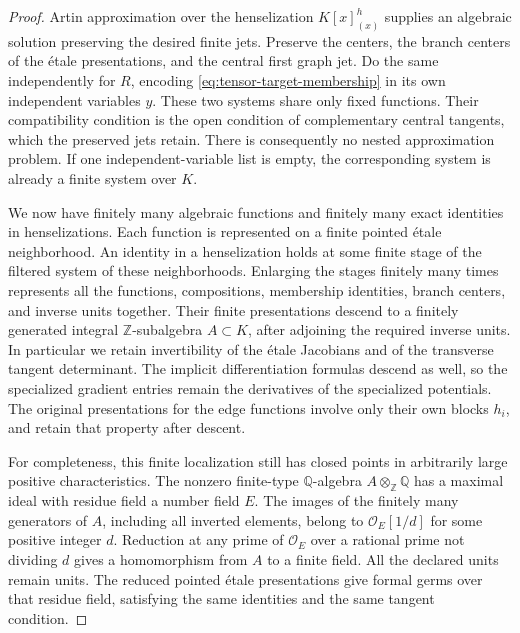 \begin{proof}
Artin approximation over the henselization \(K[x]_{(x)}^h\)
\cite[Theorem~1.10]{Artin1969} supplies an algebraic solution preserving
the desired finite jets.  Preserve the centers, the branch centers of
the étale presentations, and the central first graph jet.
Do the same independently for \(R\), encoding
\eqref{eq:tensor-target-membership} in its own independent variables \(y\).
These two systems share only fixed functions.  Their compatibility
condition is the open condition of complementary central tangents, which
the preserved jets retain.  There is consequently no nested approximation
problem.  If one independent-variable list is empty, the corresponding
system is already a finite system over \(K\).

We now have finitely many algebraic functions and finitely many exact
identities in henselizations.  Each function is represented on a finite
pointed étale neighborhood.  An identity in a henselization holds at some
finite stage of the filtered system of these neighborhoods.  Enlarging
the stages finitely many times represents all the functions, compositions,
membership identities, branch centers, and inverse units together.
Their finite presentations descend to a finitely generated integral
\(\mathbb Z\)-subalgebra \(A\subset K\), after adjoining the required
inverse units.  In particular we retain invertibility of the étale
Jacobians and of the transverse tangent determinant.  The implicit
differentiation formulas descend as well, so the specialized gradient
entries remain the derivatives of the specialized potentials.
The original presentations for the edge functions involve only their
own blocks \(h_i\), and retain that property after descent.

For completeness, this finite localization still has closed points in
arbitrarily large positive characteristics.  The nonzero finite-type
\(\mathbb Q\)-algebra \(A\otimes_{\mathbb Z}\mathbb Q\) has a maximal
ideal with residue field a number field \(E\).  The images of the finitely
many generators of \(A\), including all inverted elements, belong to
\(\mathcal O_E[1/d]\) for some positive integer \(d\).
Reduction at any prime of \(\mathcal O_E\) over a rational prime not
dividing \(d\) gives a homomorphism from \(A\) to a finite field.
All the declared units remain units.  The reduced pointed étale
presentations give formal germs over that residue field, satisfying the
same identities and the same tangent condition.
\end{proof}

